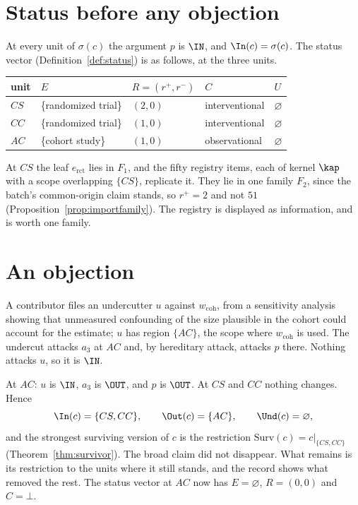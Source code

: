 \section{Status before any objection}\label{sec:case2before}

At every unit of $\sigma(c)$ the argument $p$ is $\IN$, and $\In(c)=\sigma(c)$. The status vector (Definition~\ref{def:status}) is as follows, at the three units.
\begin{center}
\small
\begin{tabular}{@{}l l l l l@{}}
\toprule
unit & $E$ & $R=(r^+,r^-)$ & $C$ & $U$\\
\midrule
$CS$ & \{randomized trial\} & $(2,0)$ & interventional & $\varnothing$\\
$CC$ & \{randomized trial\} & $(1,0)$ & interventional & $\varnothing$\\
$AC$ & \{cohort study\} & $(1,0)$ & observational & $\varnothing$\\
\bottomrule
\end{tabular}
\end{center}
At $CS$ the leaf $e_{\mathrm{rct}}$ lies in $F_1$, and the fifty registry items, each of kernel $\kap$ with a scope overlapping $\{CS\}$, replicate it. They lie in one family $F_2$, since the batch's common-origin claim stands, so $r^+=2$ and not $51$ (Proposition~\ref{prop:importfamily}). The registry is displayed as information, and is worth one family.

\section{An objection}\label{sec:case2objection}

A contributor files an undercutter $u$ against $w_{\mathrm{coh}}$, from a sensitivity analysis showing that unmeasured confounding of the size plausible in the cohort could account for the estimate; $u$ has region $\{AC\}$, the scope where $w_{\mathrm{coh}}$ is used. The undercut attacks $a_3$ at $AC$ and, by hereditary attack, attacks $p$ there. Nothing attacks $u$, so it is $\IN$.

At $AC$: $u$ is $\IN$, $a_3$ is $\OUT$, and $p$ is $\OUT$. At $CS$ and $CC$ nothing changes. Hence
\[
\In(c)=\{CS,CC\},\qquad\Out(c)=\{AC\},\qquad\Und(c)=\varnothing,
\]
and the strongest surviving version of $c$ is the restriction $\mathrm{Surv}(c)=c|_{\{CS,CC\}}$ (Theorem~\ref{thm:survivor}). The broad claim did not disappear. What remains is its restriction to the units where it still stands, and the record shows what removed the rest. The status vector at $AC$ now has $E=\varnothing$, $R=(0,0)$ and $C=\bot$.

